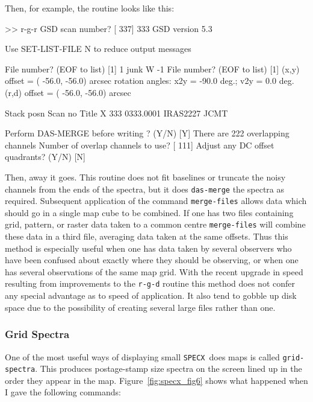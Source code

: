 \documentclass[11pt,twoside]{starlink}
\providecommand{\SPECX}{\texttt{SPECX}}
\begin{document}
Then, for example, the routine looks like this:

\begin{terminalv}
>> r-g-r
 GSD scan number? [ 337] 333
 GSD version  5.3

 Use SET-LIST-FILE N to reduce output messages

 File number? (EOF to list) [1]
 1  junk                                      W    -1
 File number? (EOF to list) [1]
          (x,y) offset = ( -56.0, -56.0) arcsec
          rotation angles: x2y =  -90.0 deg.; v2y =    0.0 deg.
          (r,d) offset = ( -56.0, -56.0) arcsec


 Stack posn    Scan no    Title
     X          333      0333.0001   IRAS2227 JCMT

 Perform DAS-MERGE before writing ? (Y/N) [Y]
There are  222 overlapping channels
 Number of overlap channels to use? [ 111]
 Adjust any DC offset quadrants? (Y/N) [N]

\end{terminalv}

Then, away it goes. This routine does not fit baselines or truncate
the noisy channels from the ends of the spectra, but it
does \texttt{das-merge} the spectra as required. Subsequent application
of the command \texttt{merge-files} allows data which should go in a
single map cube to be combined. If one has two files containing
grid, pattern, or raster data taken to a common centre \texttt{merge-files} will combine these data in a third file, averaging data
taken at the same offsets. Thus this method is especially useful when
one has data taken by several observers who have been confused about
exactly where they should be observing, or when one has several
observations of the same map grid. With the recent upgrade in speed
resulting from improvements to the \texttt{r-g-d} routine this method
does not confer any special advantage as to speed of application. It
also tend to gobble up disk space due to the possibility of creating
several large files rather than one.

\subsubsection{Grid Spectra}
\label{sec:specx_13.3}
One of the most useful ways of displaying small \SPECX\ does maps is
called \texttt{grid-spectra}. This produces postage-stamp size spectra on
the screen lined up in the order they appear in the map.
Figure~\ref{fig:specx_fig6} shows what happened when I gave the
following commands:
\end{document}
